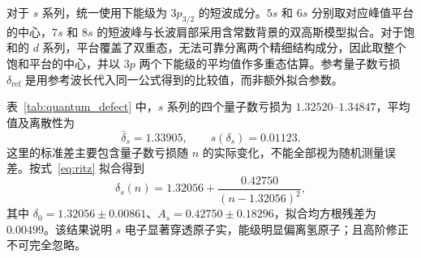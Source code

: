 \documentclass[UTF8,a4paper,11pt]{ctexart}
\begin{document}
对于 $s$ 系列，统一使用下能级为 $3p_{3/2}$ 的短波成分。$5s$ 和 $6s$ 分别取对应峰值平台的中心，$7s$ 和 $8s$ 的短波峰与长波肩部采用含常数背景的双高斯模型拟合。对于饱和的 $d$ 系列，平台覆盖了双重态，无法可靠分离两个精细结构成分，因此取整个饱和平台的中心，并以 $3p$ 两个下能级的平均值作多重态估算。参考量子数亏损 $\delta_{\mathrm{ref}}$ 是用参考波长代入同一公式得到的比较值，而非额外拟合参数。

\begin{table}[H]
  \centering
  \caption{钠原子里德伯系列的项能、有效量子数和量子数亏损}
  \label{tab:quantum_defect}
  \small
\end{table}

表~\ref{tab:quantum_defect} 中，$s$ 系列的四个量子数亏损为 $1.32520$--$1.34847$，平均值及离散性为
\begin{equation}
  \bar\delta_s=1.33905,\qquad s(\delta_s)=0.01123.
\end{equation}
这里的标准差主要包含量子数亏损随 $n$ 的实际变化，不能全部视为随机测量误差。按式~\eqref{eq:ritz} 拟合得到
\begin{equation}
  \boxed{\delta_s(n)=1.32056+\frac{0.42750}{(n-1.32056)^2}},
\end{equation}
其中 $\delta_0=1.32056\pm0.00861$、$A_s=0.42750\pm0.18296$，拟合均方根残差为 $0.00499$。该结果说明 $s$ 电子显著穿透原子实，能级明显偏离氢原子；且高阶修正不可完全忽略。
\end{document}
